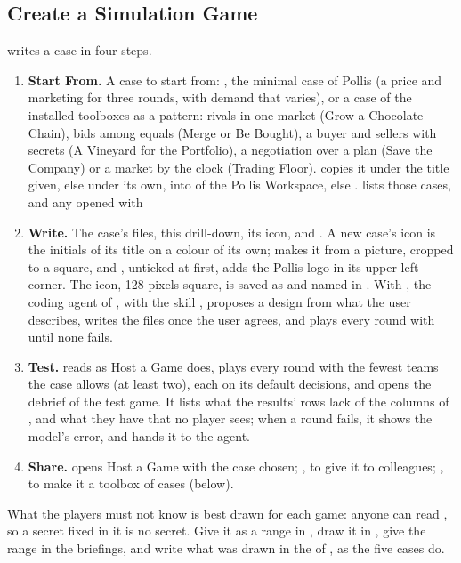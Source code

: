\subsection{Create a Simulation Game}
 writes a case in four steps.
\begin{enumerate}
  \item \textbf{Start From.} A case to start from: , the minimal case of Pollis (a price and
    marketing for three rounds, with demand that varies), or a case of the installed toolboxes as a pattern: rivals in one market (Grow a Chocolate Chain),
    bids among equals (Merge or Be Bought), a buyer and sellers with secrets (A Vineyard for the Portfolio), a
    negotiation over a plan (Save the Company) or a market by the clock (Trading Floor). 
    copies it under the title given, else under its own,
    into  of the Pollis Workspace, else
    .  lists those cases, and any opened with
  \item \textbf{Write.} The case's files, this drill-down, its icon, and . A new case's icon is
    the initials of its title on a colour of its own;  makes it from a picture, cropped to a
    square, and , unticked at first, adds the Pollis logo in its upper left corner. The icon, 128
    pixels square, is saved as  and named in . With , the coding agent of
    , with the skill , proposes a design from what the user
    describes, writes the files once the user agrees, and plays every round with  until none fails.
  \item \textbf{Test.}  reads  as Host a Game does, plays every round with the
    fewest teams the case allows (at least two), each on its default decisions, and opens the debrief of the test
    game. It lists what the results' rows lack of the columns of , and what they have that no player
    sees; when a round fails, it shows the model's error, and  hands it to the agent.
  \item \textbf{Share.}  opens Host a Game with the case chosen; , to give it
    to colleagues; , to make it a toolbox of cases (below).
\end{enumerate}
What the players must not know is best drawn for each game: anyone can read , so a secret fixed in
it is no secret. Give it as a range  in \file{[parameters]}, draw it in , give the
range in the briefings, and write what was drawn in the  of , as the five cases do.

